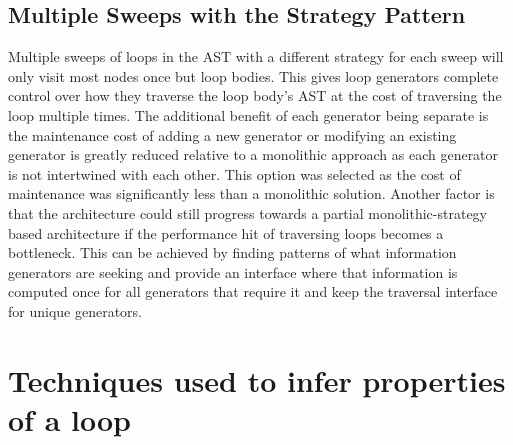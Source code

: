 
\subsection{Multiple Sweeps with the Strategy Pattern}

Multiple sweeps of loops in the AST with a different strategy for each sweep
will only visit most nodes once but loop bodies.
This gives loop generators complete control over how they traverse the loop
body's AST at the cost of traversing the loop multiple times.
The additional benefit of each generator being separate is the maintenance cost
of adding a new generator or modifying an existing generator is greatly reduced
relative to a monolithic approach as each generator is not intertwined with
each other.
This option was selected as the cost of maintenance was significantly less
than a monolithic solution.
Another factor is that the architecture could still progress towards
a partial monolithic-strategy based architecture if the performance hit
of traversing loops becomes a bottleneck.
This can be achieved by finding patterns of what information generators are
seeking and provide an interface where that information is computed once for
all generators that require it and keep the traversal interface for unique generators.

\section{Techniques used to infer properties of a loop}

